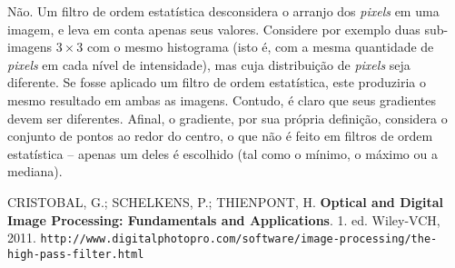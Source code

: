 \documentclass[10pt,a4paper]{article}
\newcommand{\pixels}{\textit{pixels} }
\begin{document}
\begin{enumerate}
  Não. Um filtro de ordem estatística desconsidera o arranjo dos \pixels em uma imagem, e leva em conta apenas seus valores. Considere por exemplo duas sub-imagens $3\times3$ com o mesmo histograma (isto é, com a mesma quantidade de \pixels em cada nível de intensidade), mas cuja distribuição de \pixels seja diferente. Se fosse aplicado um filtro de ordem estatística, este produziria o mesmo resultado em ambas as imagens. Contudo, é claro que seus gradientes devem ser diferentes. Afinal, o gradiente, por sua própria definição, considera o conjunto de pontos ao redor do centro, o que não é feito em filtros de ordem estatística -- apenas um deles é escolhido (tal como o mínimo, o máximo ou a mediana).
\end{enumerate}

\begin{thebibliography}{99}
     CRISTOBAL, G.; SCHELKENS, P.; THIENPONT, H. \textbf{Optical and Digital Image Processing: Fundamentals and Applications}. 1. ed. Wiley-VCH, 2011.
     \texttt{http://www.digitalphotopro.com/software/image-processing/the-high-pass-filter.html}
\end{thebibliography}
\end{document}
